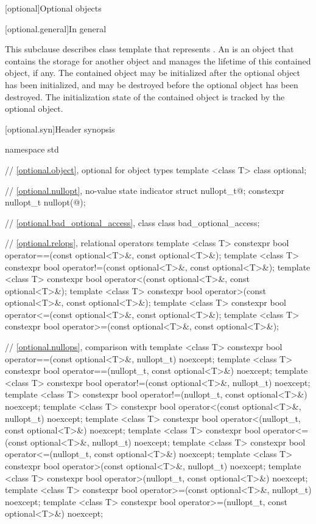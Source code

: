 [optional]{Optional objects}

[optional.general]{In general}

\pnum
This subclause describes class template  that represents
. An  is an
object that contains the storage for another object and manages the lifetime of
this contained object, if any. The contained object may be initialized after
the optional object has been initialized, and may be destroyed before the
optional object has been destroyed. The initialization state of the contained
object is tracked by the optional object.

[optional.syn]{Header  synopsis}

%
\begin{codeblock}
namespace std {
  // \ref{optional.object}, optional for object types
  template <class T> class optional;

  // \ref{optional.nullopt}, no-value state indicator
  struct nullopt_t{@\seebelow@};
  constexpr nullopt_t nullopt(@\unspec@);

  // \ref{optional.bad_optional_access}, class 
  class bad_optional_access;

  // \ref{optional.relops}, relational operators
  template <class T>
  constexpr bool operator==(const optional<T>&, const optional<T>&);
  template <class T>
  constexpr bool operator!=(const optional<T>&, const optional<T>&);
  template <class T>
  constexpr bool operator<(const optional<T>&, const optional<T>&);
  template <class T>
  constexpr bool operator>(const optional<T>&, const optional<T>&);
  template <class T>
  constexpr bool operator<=(const optional<T>&, const optional<T>&);
  template <class T>
  constexpr bool operator>=(const optional<T>&, const optional<T>&);

  // \ref{optional.nullops}, comparison with 
  template <class T> constexpr bool operator==(const optional<T>&, nullopt_t) noexcept;
  template <class T> constexpr bool operator==(nullopt_t, const optional<T>&) noexcept;
  template <class T> constexpr bool operator!=(const optional<T>&, nullopt_t) noexcept;
  template <class T> constexpr bool operator!=(nullopt_t, const optional<T>&) noexcept;
  template <class T> constexpr bool operator<(const optional<T>&, nullopt_t) noexcept;
  template <class T> constexpr bool operator<(nullopt_t, const optional<T>&) noexcept;
  template <class T> constexpr bool operator<=(const optional<T>&, nullopt_t) noexcept;
  template <class T> constexpr bool operator<=(nullopt_t, const optional<T>&) noexcept;
  template <class T> constexpr bool operator>(const optional<T>&, nullopt_t) noexcept;
  template <class T> constexpr bool operator>(nullopt_t, const optional<T>&) noexcept;
  template <class T> constexpr bool operator>=(const optional<T>&, nullopt_t) noexcept;
  template <class T> constexpr bool operator>=(nullopt_t, const optional<T>&) noexcept;

}
\end{codeblock}
